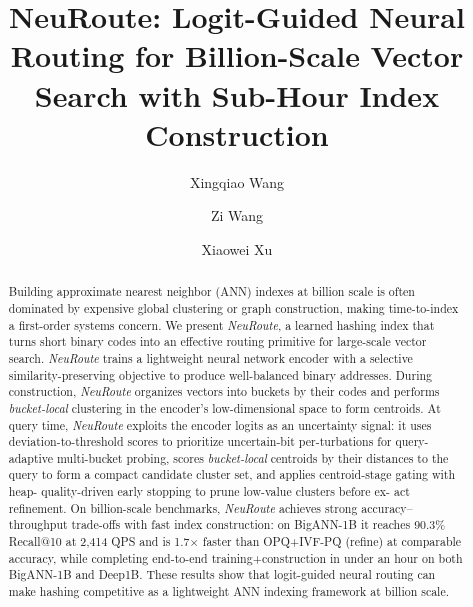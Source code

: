 \documentclass[sigconf, nonacm]{acmart}
\begin{document}
\title{NeuRoute: Logit-Guided Neural Routing for Billion-Scale Vector Search with Sub-Hour Index Construction}

\author{Xingqiao Wang}

\author{Zi Wang}

\author{Xiaowei Xu}



\begin{abstract}
Building approximate nearest neighbor (ANN) indexes at billion
scale is often dominated by expensive global clustering or graph
construction, making time-to-index a first-order systems concern.
We present \emph{NeuRoute}, a learned hashing index that turns short binary codes into an effective routing primitive for large-scale vector search. \emph{NeuRoute} trains a lightweight neural network encoder with a selective similarity-preserving objective to produce well-balanced binary
addresses. During construction, \emph{NeuRoute} organizes vectors into buckets by their codes and performs \emph{bucket-local} clustering in the encoder’s low-dimensional space to form centroids. At query time, \emph{NeuRoute} exploits the encoder logits as an uncertainty signal: it uses deviation-to-threshold scores to prioritize uncertain-bit per-turbations for query-adaptive multi-bucket probing, scores \emph{bucket-local} centroids by their distances to the query to form a compact
candidate cluster set, and applies centroid-stage gating with heap-
quality-driven early stopping to prune low-value clusters before ex-
act refinement.
On billion-scale benchmarks, \emph{NeuRoute} achieves strong accuracy--throughput trade-offs with fast index construction: on BigANN-1B it reaches 90.3\% Recall@10 at 2{,}414 QPS and is 1.7$\times$ faster than OPQ+IVF-PQ (refine) at comparable accuracy, while completing end-to-end training+construction in under an hour on both BigANN-1B and Deep1B.
These results show that logit-guided neural routing can make hashing competitive as a lightweight ANN indexing framework at billion scale.
\end{abstract}
\end{document}
